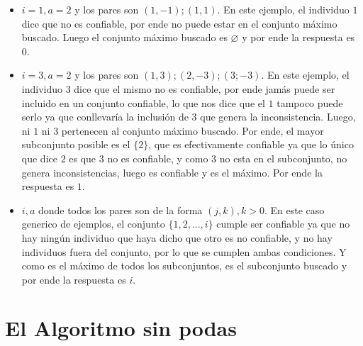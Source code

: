 \documentclass[A4paper,oneside,fleqn,10pt]{article}
\theoremstyle{definition}
\let\emptyset\varnothing
\begin{document}
\begin{itemize}

\item $i=1, a=2$ y los pares son $(1,-1);(1,1)$. 
En este ejemplo, el individuo $1$ dice que no es confiable, por ende no puede estar en el conjunto máximo buscado. Luego el conjunto máximo buscado es $\emptyset$ y por ende la respuesta es $0$.

\item $i=3, a=2$ y los pares son $(1,3);(2,-3); (3; -3)$. 
En este ejemplo, el individuo $3$ dice que el mismo no es confiable, por ende jamás puede ser incluido en un conjunto confiable, lo que nos dice que el $1$ tampoco puede serlo ya que conllevaría la inclusión de $3$ que genera la inconsistencia. Luego, ni $1$ ni $3$ pertenecen al conjunto máximo buscado. Por ende, el mayor subconjunto posible es el $\{2\}$, que es efectivamente confiable ya que lo único que dice $2$ es que $3$ no es confiable, y como $3$ no esta en el subconjunto, no genera inconsistencias, luego es confiable y es el máximo. Por ende la respuesta es $1$.

\item $i, a$ donde todos los pares son de la forma $(j,k), k>0$.
En este caso generico de ejemplos, el conjunto $\{1,2,...,i\}$ cumple ser confiable ya que no hay ningún individuo que haya dicho que otro es no confiable, y no hay individuos fuera del conjunto, por lo que se cumplen ambas condiciones. Y como es el máximo de todos los subconjuntos, es el subconjunto buscado y por ende la respuesta es $i$.

\end{itemize}

\section{El Algoritmo sin podas}
\end{document}

